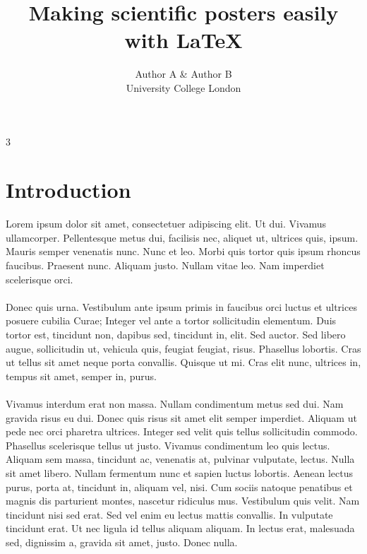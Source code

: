 \documentclass[a0,final]{a0poster}
\title{Making scientific posters easily with \LaTeX}
\author{Author A \& Author B\\
University College London}
\begin{document}
\begin{minipage}{\textwidth}					%
\maketitle
\end{minipage}
\vspace{1cm}

\begin{multicols}{3}							%
\raggedcolumns							%

\section*{Introduction}
Lorem ipsum dolor sit amet, consectetuer adipiscing elit. Ut dui. Vivamus ullamcorper. Pellentesque metus dui, facilisis nec, aliquet ut, ultrices quis, ipsum. Mauris semper venenatis nunc. Nunc et leo. Morbi quis tortor quis ipsum rhoncus faucibus. Praesent nunc. Aliquam justo. Nullam vitae leo. Nam imperdiet scelerisque orci.\\
\\
Donec quis urna. Vestibulum ante ipsum primis in faucibus orci luctus et ultrices posuere cubilia Curae; Integer vel ante a tortor sollicitudin elementum. Duis tortor est, tincidunt non, dapibus sed, tincidunt in, elit. Sed auctor. Sed libero augue, sollicitudin ut, vehicula quis, feugiat feugiat, risus. Phasellus lobortis. Cras ut tellus sit amet neque porta convallis. Quisque ut mi. Cras elit nunc, ultrices in, tempus sit amet, semper in, purus.\\
\\
Vivamus interdum erat non massa. Nullam condimentum metus sed dui. Nam gravida risus eu dui. Donec quis risus sit amet elit semper imperdiet. Aliquam ut pede nec orci pharetra ultrices. Integer sed velit quis tellus sollicitudin commodo. Phasellus scelerisque tellus ut justo. Vivamus condimentum leo quis lectus. Aliquam sem massa, tincidunt ac, venenatis at, pulvinar vulputate, lectus. Nulla sit amet libero. Nullam fermentum nunc et sapien luctus lobortis. Aenean lectus purus, porta at, tincidunt in, aliquam vel, nisi. Cum sociis natoque penatibus et magnis dis parturient montes, nascetur ridiculus mus. Vestibulum quis velit. Nam tincidunt nisi sed erat. Sed vel enim eu lectus mattis convallis. In vulputate tincidunt erat. Ut nec ligula id tellus aliquam aliquam. In lectus erat, malesuada sed, dignissim a, gravida sit amet, justo. Donec nulla.



\end{multicols}
\end{document}
